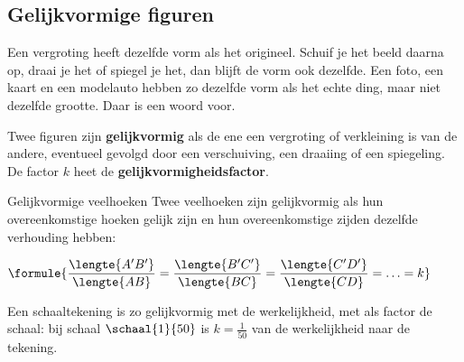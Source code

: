 \subsection{Gelijkvormige figuren}

Een vergroting heeft dezelfde vorm als het origineel. Schuif je het beeld daarna op, draai je het of spiegel je het, dan blijft de vorm ook dezelfde. Een foto, een kaart en een modelauto hebben zo dezelfde vorm als het echte ding, maar niet dezelfde grootte. Daar is een woord voor.

\begin{theorie}
Twee figuren zijn \textbf{\textcolor{accent}{gelijkvormig}} als de ene een vergroting of verkleining is van de andere, eventueel gevolgd door een verschuiving, een draaiing of een spiegeling. De factor $k$ heet de \textbf{\textcolor{accent}{gelijkvormigheidsfactor}}.

\begin{stelling}{Gelijkvormige veelhoeken}
Twee veelhoeken zijn gelijkvormig als hun overeenkomstige hoeken gelijk zijn en hun overeenkomstige zijden dezelfde verhouding hebben:

\vspace{1mm}
\qquad $\formule{\dfrac{\lengte{A'B'}}{\lengte{AB}} = \dfrac{\lengte{B'C'}}{\lengte{BC}} = \dfrac{\lengte{C'D'}}{\lengte{CD}} = \ldots = k}$
\end{stelling}
\end{theorie}

Een schaaltekening is zo gelijkvormig met de werkelijkheid, met als factor de schaal: bij schaal $\schaal{1}{50}$ is $k = \tfrac{1}{50}$ van de werkelijkheid naar de tekening.


